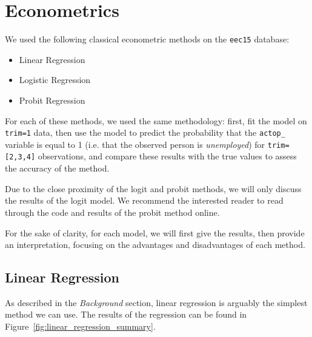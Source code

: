 \section{Econometrics}
We used the following classical econometric methods on the \texttt{eec15} database:

\begin{itemize}
    \item Linear Regression
    \item Logistic Regression
    \item Probit Regression
\end{itemize}

For each of these methods, we used the same methodology: first, fit the model on \texttt{trim=1} data, then use the model to predict the probability that the \texttt{actop\_} variable is equal to 1 (i.e. that the observed person is \textit{unemployed}) for \texttt{trim=[2,3,4]} observations, and compare these results with the true values to assess the accuracy of the method.

Due to the close proximity of the logit and probit methods, we will only discuss the results of the logit model. We recommend the interested reader to read through the code and results of the probit method online.

For the sake of clarity, for each model, we will first give the results, then provide an interpretation, focusing on the advantages and disadvantages of each method.

\subsection{Linear Regression}
As described in the \textit{Background} section, linear regression is arguably the simplest method we can use. The results of the regression can be found in Figure~\ref{fig:linear_regression_summary}.

